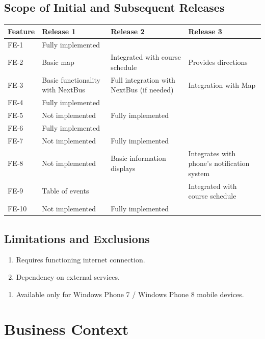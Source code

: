 \documentclass[pdftex,12pt,letter]{article}
\begin{document}
\subsection{Scope of Initial and Subsequent Releases}
\begin{table}[h]
\begin{tabularx}{\textwidth }[t]{|l|Y|Y|Y|}
\hline
\bfseries Feature & \bfseries\hspace{1cm}Release 1 & \bfseries\hspace{1cm}Release 2 & \bfseries\hspace{1cm}Release 3 \\ \hline
FE-1 & Fully implemented & ~ & ~ \\ \hline
FE-2 & Basic map & Integrated with course schedule & Provides directions \\ \hline
FE-3 & Basic functionality with NextBus & Full integration with NextBus (if needed) & Integration with Map \\ \hline
FE-4 & Fully implemented & ~ & ~ \\ \hline
FE-5 & Not implemented & Fully implemented & ~ \\ \hline
FE-6 & Fully implemented & ~ & ~ \\ \hline
FE-7 & Not implemented & Fully implemented & ~ \\ \hline
FE-8 & Not implemented & Basic information displays & Integrates with phone's notification system \\ \hline
FE-9 & Table of events & ~ & Integrated with course schedule \\ \hline
FE-10 & Not implemented & Fully implemented & ~ \\
\hline
\end{tabularx}
\end{table}
\subsection{Limitations and Exclusions}
\begin{enumerate}[L{I}-1:]
\item Requires functioning internet connection.
\item Dependency on external services.
\end{enumerate}
\begin{enumerate}[EX-1:]
\item Available only for Windows Phone 7 / Windows Phone 8 mobile devices.
\end{enumerate}
\section{Business Context}
\end{document}
